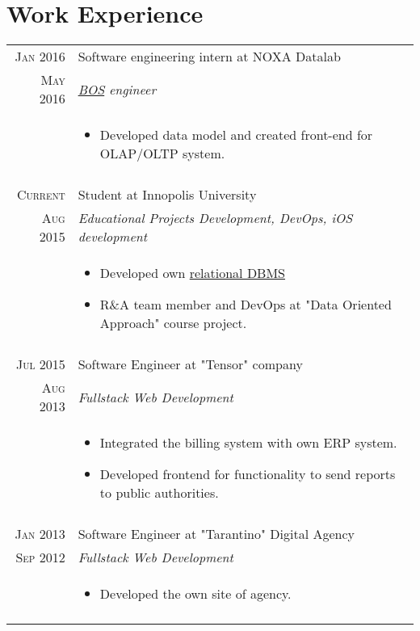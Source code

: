 \documentclass[a4paper,10pt]{article}
\begin{document}
\section{Work Experience}
\begin{tabular}{r|p{11cm}}
 \textsc{Jan 2016} & Software engineering intern at NOXA Datalab \\\textsc{May 2016}&\emph{\href{http://www.intel.eu/content/www/eu/en/processors/xeon/nomura-bos-solution-brief.html}{BOS} engineer}\\&\footnotesize{
 \begin{itemize}
 \item Developed data model and created front-end for OLAP/OLTP system.
 \end{itemize}
 }\\\multicolumn{2}{c}{}\\
 \textsc{Current} & Student at Innopolis University \\\textsc{Aug 2015}&\emph{Educational Projects Development, DevOps, iOS development}\\&\footnotesize{
 \begin{itemize}
 \item Developed own \href{https://github.com/BeInLife/DBMS}{relational DBMS}
 \item R\&A team member and DevOps at "Data Oriented Approach" course project.
 \end{itemize}
 }\\\multicolumn{2}{c}{} \\
 \textsc{Jul 2015} & Software Engineer at "Tensor" company \\\textsc{Aug 2013}&\emph{Fullstack Web Development}\\&
 \footnotesize{
 \begin{itemize}
 \item Integrated the billing system with own ERP system.
 \item Developed frontend for functionality to send reports to public authorities.
 \end{itemize}
 }\\
 \multicolumn{2}{c}{} \\
 \textsc{Jan 2013} & Software Engineer at "Tarantino" Digital Agency \\\textsc{Sep 2012}&\emph{Fullstack Web Development}\\&\footnotesize{
 \begin{itemize}
 \item Developed the own site of agency.
 \end{itemize}
 }\\\multicolumn{2}{c}{}
\end{tabular}
\end{document}
